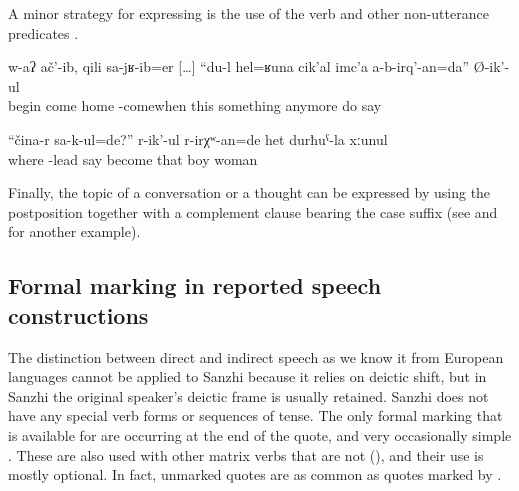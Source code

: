 A minor strategy for expressing  is the use of the verb   and other non-utterance predicates .
%
\begin{exe}
	\ex	\label{ex:He began when he came home, I will not anymore do things like this}
	\gll	w-aʔ	ač'-ib,	qili	sa-jʁ-ib=er	[\ldots]	``du-l	hel=ʁuna	cik'al	imc'a	a-b-irq'-an=da''	Ø-ik'-ul\\
		begin	come	home	-comewhen	{}		this something	anymore	do	say\\
	\glt	{}

	\ex	\label{ex:‎‎‎The daughter-in-law must have asked, From where do you bring the body}
	\gll	``čina-r	sa-k-ul=de?''	r-ik'-ul	r-irχʷ-an=de	het	durħuˁ-la	xːunul	\\
		where	-lead	say	become	that	boy	woman\\
	\glt	{}
\end{exe}

Finally, the topic of a conversation or a thought can be expressed by using the postposition   together with a complement clause bearing the  case suffix (see  and  for another example).



\subsection{Formal marking in reported speech constructions}
\label{ssec:Formal marking in reported speech constructions}

The distinction between direct and indirect speech as we know it from European languages cannot be applied to Sanzhi because it relies on deictic shift, but in Sanzhi the original speaker's deictic frame is usually retained. Sanzhi does not have any special verb forms or sequences of tense. The only formal marking that is available for  are   occurring at the end of the quote, and very occasionally simple . These   are also used with other matrix verbs that are not  (), and their use is mostly optional. In fact, unmarked quotes are as common as quotes marked by  .

